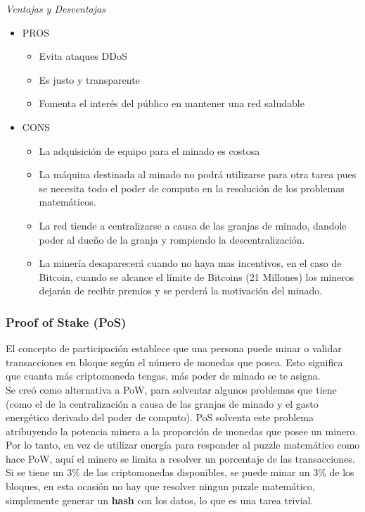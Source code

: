\emph{Ventajas y Desventajas}
\begin{itemize}
\item PROS
  \begin{itemize}
  \item Evita ataques DDoS
  \item Es justo y transparente
  \item Fomenta el interés del público en mantener una red saludable
  \end{itemize}
\item CONS
  \begin{itemize}
  \item La adquisición de equipo para el minado es costosa
  \item La máquina destinada al minado no podrá utilizarse para otra tarea pues se necesita todo el poder de computo en la resolución de los problemas matemáticos.
  \item La red tiende a centralizarse a causa de las granjas de minado, dandole poder al dueño de la granja y rompiendo la descentralización.
  \item La minería desaparecerá cuando no haya mas incentivos, en el caso de Bitcoin, cuando se alcance el límite de Bitcoins (21 Millones) los mineros dejarán de recibir premios y se perderá la motivación del minado.
  \end{itemize}
\end{itemize}

\subsubsection{Proof of Stake (PoS)}

El concepto de participación establece que una persona puede minar o validar transacciones en bloque según el número de monedas que posea. Esto significa que cuanta más criptomoneda tengas, más poder de minado se te asigna. \\ 

Se creó como alternativa a PoW, para solventar algunos problemas que tiene (como el de la centralización a causa de las granjas de minado y el gasto energético derivado del poder de computo). PoS solventa este problema atribuyendo la potencia minera a la proporción de monedas que posee un minero. Por lo tanto, en vez de utilizar energía para responder al puzzle matemático como hace PoW, aquí el minero se limita a resolver un porcentaje de las transacciones. Si se tiene un 3\% de las criptomonedas disponibles, se puede minar un 3\% de los bloques, en esta ocasión no hay que resolver ningun puzzle matemático, simplemente generar un \textbf{hash} con los datos, lo que es una tarea trivial. \\

